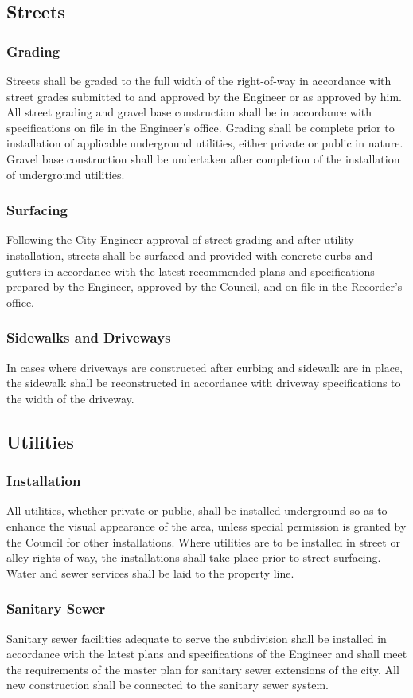 \subsection{Streets}
\subsubsection{Grading}
Streets shall be graded to the full width of the right-of-way in accordance with street grades submitted to and approved by the Engineer or as approved by him. All street grading and gravel base construction shall be in accordance with specifications on file in the Engineer’s office. Grading shall be complete prior to installation of applicable underground utilities, either private or public in nature. Gravel base construction shall be undertaken after completion of the installation of underground utilities.
\subsubsection{Surfacing}
Following the City Engineer approval of street grading and after utility installation, streets shall be surfaced and provided with concrete curbs and gutters in accordance with the latest recommended plans and specifications prepared by the Engineer, approved by the Council, and on file in the Recorder’s office.
\subsubsection{Sidewalks and Driveways}
In cases where driveways are constructed after curbing and sidewalk are in place, the sidewalk shall be reconstructed in accordance with driveway specifications to the width of the driveway.
\subsection{Utilities}
\subsubsection{Installation}
All utilities, whether private or public, shall be installed underground so as to enhance the visual appearance of the area, unless special permission is granted by the Council for other installations. Where utilities are to be installed in street or alley rights-of-way, the installations shall take place prior to street surfacing. Water and sewer services shall be laid to the property line.
\subsubsection{Sanitary Sewer}
Sanitary sewer facilities adequate to serve the subdivision shall be installed in accordance with the latest plans and specifications of the Engineer and shall meet the requirements of the master plan for sanitary sewer extensions of the city. All new construction shall be connected to the sanitary sewer system.
